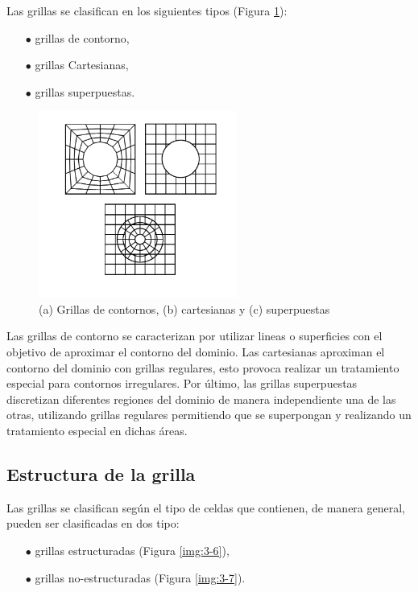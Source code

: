 \documentclass[a4paper,10pt, oneside]{book}
\begin{document}
Las grillas se clasifican en los siguientes tipos (Figura \ref{img:3-5}):
\begin{itemize} 
	\item[$\bullet$] grillas de contorno,
	\item[$\bullet$] grillas Cartesianas,
	\item[$\bullet$] grillas superpuestas.
\end{itemize}
\begin{figure}[h!]
	\centering
	\includegraphics[width=6.5cm]{Img/3-6}
	\caption{(a) Grillas de contornos, (b) cartesianas y (c) superpuestas}
	\label{img:3-5}
\end{figure}
Las grillas de contorno se caracterizan por utilizar lineas o superficies con el objetivo de aproximar el contorno del dominio. Las cartesianas aproximan el contorno del dominio con grillas regulares, esto provoca realizar un tratamiento especial para contornos irregulares. Por último, las grillas superpuestas discretizan diferentes regiones del dominio de manera independiente una de las otras, utilizando grillas regulares permitiendo que se superpongan y realizando un tratamiento especial en dichas áreas. 

\subsection{Estructura de la grilla}

Las grillas se clasifican según el tipo de celdas que contienen, de manera general, pueden ser clasificadas en dos tipo:
\begin{itemize} 
	\item[$\bullet$] grillas estructuradas (Figura \ref{img:3-6}),
	\item[$\bullet$] grillas no-estructuradas (Figura \ref{img:3-7}).
\end{itemize}
\end{document}

